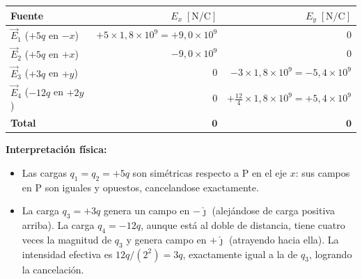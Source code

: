 \documentclass[12pt,letterpaper]{article}
\begin{document}
\medskip
\begin{center}
\begin{tabular}{lrr}
\toprule
\textbf{Fuente} & $E_x\;[\text{N/C}]$ & $E_y\;[\text{N/C}]$ \\
\midrule
$\vec{E}_1$ ($+5q$ en $-x$) & $+5\times1{,}8\times10^9 = +9{,}0\times10^9$ & $0$ \\
$\vec{E}_2$ ($+5q$ en $+x$) & $-9{,}0\times10^9$                           & $0$ \\
$\vec{E}_3$ ($+3q$ en $+y$) & $0$                                          & $-3\times1{,}8\times10^9 = -5{,}4\times10^9$ \\
$\vec{E}_4$ ($-12q$ en $+2y$) & $0$                                        & $+\frac{12}{4}\times1{,}8\times10^9 = +5{,}4\times10^9$ \\
\midrule
\textbf{Total}   & $\mathbf{0}$ & $\mathbf{0}$ \\
\bottomrule
\end{tabular}
\end{center}

\medskip
\noindent\textbf{Interpretaci\'on f\'isica:}
\begin{itemize}
    \item Las cargas $q_1 = q_2 = +5q$ son sim\'etricas respecto a P en el eje $x$:
    sus campos en P son iguales y opuestos, cancelandose exactamente.

    \item La carga $q_3 = +3q$ genera un campo en $-\hat{\jmath}$ (alej\'andose de
    carga positiva arriba). La carga $q_4 = -12q$, aunque est\'a al doble de
    distancia, tiene cuatro veces la magnitud de $q_3$ y genera campo en $+\hat{\jmath}$
    (atrayendo hacia ella). La intensidad efectiva es $12q/(2^2) = 3q$, exactamente
    igual a la de $q_3$, logrando la cancelaci\'on.
\end{itemize}
\end{document}
